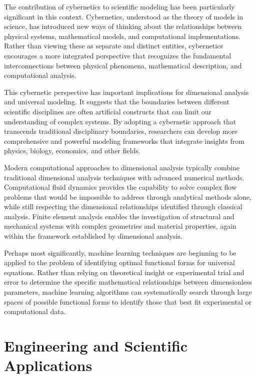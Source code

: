 \documentclass[
	11pt, %
	fleqn, %
	a4paper, %
]{LegrandOrangeBook}
\begin{document}
The contribution of cybernetics to scientific modeling \cite{longo2021} has been particularly significant in this context. Cybernetics, understood as the theory of models in science, has introduced new ways of thinking about the relationships between physical systems, mathematical models, and computational implementations. Rather than viewing these as separate and distinct entities, cybernetics encourages a more integrated perspective that recognizes the fundamental interconnections between physical phenomena, mathematical description, and computational analysis.

This cybernetic perspective has important implications for dimensional analysis and universal modeling. It suggests that the boundaries between different scientific disciplines are often artificial constructs that can limit our understanding of complex systems. By adopting a cybernetic approach that transcends traditional disciplinary boundaries, researchers can develop more comprehensive and powerful modeling frameworks that integrate insights from physics, biology, economics, and other fields.

Modern computational approaches to dimensional analysis typically combine traditional dimensional analysis techniques with advanced numerical methods. Computational fluid dynamics provides the capability to solve complex flow problems that would be impossible to address through analytical methods alone, while still respecting the dimensional relationships identified through classical analysis. Finite element analysis enables the investigation of structural and mechanical systems with complex geometries and material properties, again within the framework established by dimensional analysis.

Perhaps most significantly, machine learning techniques are beginning to be applied to the problem of identifying optimal functional forms for universal equations. Rather than relying on theoretical insight or experimental trial and error to determine the specific mathematical relationships between dimensionless parameters, machine learning algorithms can systematically search through large spaces of possible functional forms to identify those that best fit experimental or computational data.

\section{Engineering and Scientific Applications}
\end{document}
